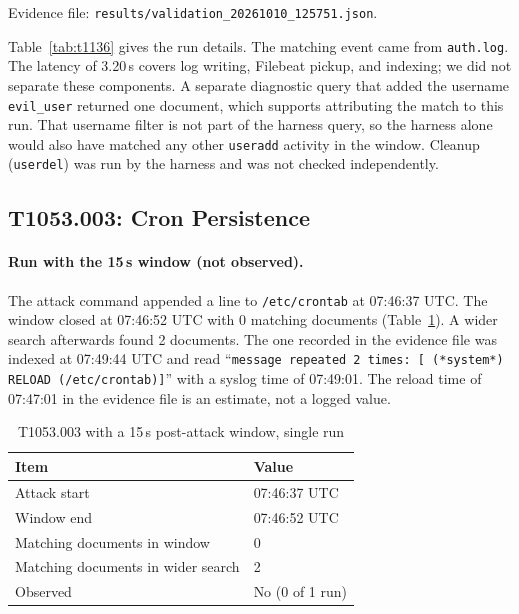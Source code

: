 \documentclass[11pt,a4paper]{article}
\begin{document}
Evidence file: \texttt{results/validation\_20261010\_125751.json}.

Table~\ref{tab:t1136} gives the run details. The matching event came from
\texttt{auth.log}. The latency of 3.20\,s
covers log writing, Filebeat pickup, and indexing; we did not separate these
components. A separate diagnostic query that added the username
\texttt{evil\_user} returned one document, which supports attributing the
match to this run. That username filter is not part of the harness query, so
the harness alone would also have matched any other \texttt{useradd} activity
in the window. Cleanup (\texttt{userdel}) was run by the harness and was not
checked independently.

\subsection{T1053.003: Cron Persistence}
\label{sec:cron}

\paragraph{Run with the 15\,s window (not observed).}
The attack command appended a line to \texttt{/etc/crontab} at 07:46:37 UTC.
The window closed at 07:46:52 UTC with 0 matching documents
(Table~\ref{tab:cron15}). A wider search afterwards found 2 documents. The one
recorded in the evidence file was indexed at 07:49:44 UTC and read
``\texttt{message repeated 2 times: [ (*system*) RELOAD (/etc/crontab)]}''
with a syslog time of 07:49:01. The reload time of 07:47:01 in the evidence
file is an estimate, not a logged value.

\begin{table}[H]
    \centering
    \caption{T1053.003 with a 15\,s post-attack window, single run}
    \label{tab:cron15}
    \begin{tabular}{ll}
        \toprule
        \textbf{Item} & \textbf{Value} \\
        \midrule
        Attack start & 07:46:37 UTC \\
        Window end & 07:46:52 UTC \\
        Matching documents in window & 0 \\
        Matching documents in wider search & 2 \\
        Observed & No (0 of 1 run) \\
        \bottomrule
    \end{tabular}
\end{table}
\end{document}
